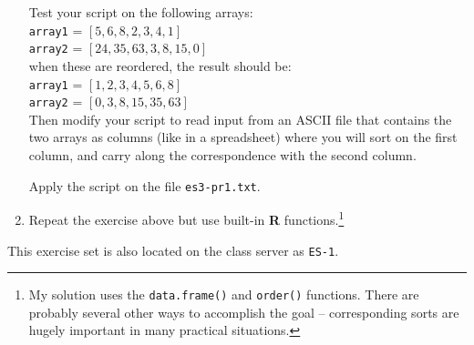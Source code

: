\begin{enumerate}
Test your script on the following arrays:\\
\texttt{array1} = $[5,6,8,2,3,4,1]$\\
\texttt{array2} = $[24,35,63,3,8,15,0]$\\

when these are reordered, the result should be: \\
\texttt{array1} = $[1,2,3,4,5,6,8]$\\
\texttt{array2} = $[0,3,8,15,35,63]$\\

Then modify your script to read input from an ASCII file that contains the two arrays as columns (like in a spreadsheet) where you will sort on the first column, and carry along the correspondence with the second column.

Apply the script on the file \texttt{es3-pr1.txt}.

\item Repeat the exercise above but use built-in \textbf{R} functions.\footnote{My solution uses the \texttt{data.frame()} and \texttt{order()} functions.  There are probably several other ways to accomplish the goal -- corresponding sorts are hugely important in many practical situations.} 
\end{enumerate}

This exercise set is also located on the class server as \texttt{ES-1}.
